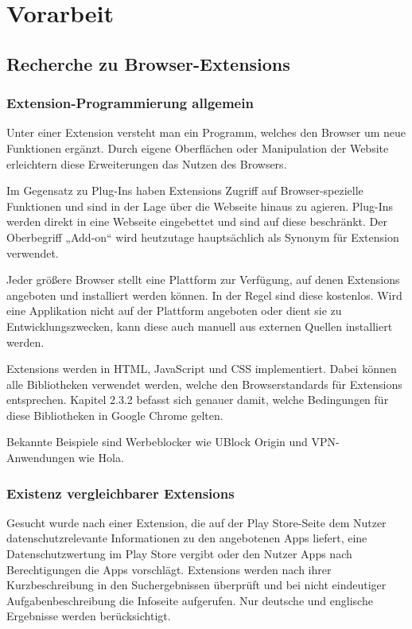 \chapter{Vorarbeit}
\label{c:vorarbeit}


\section{Recherche zu Browser-Extensions}
\label{s:recherchebrowserextensions}

\subsection{Extension-Programmierung allgemein}
\label{ss:extensionprogallg}

Unter einer Extension versteht man ein Programm, welches den Browser um neue Funktionen ergänzt. Durch eigene Oberflächen oder Manipulation der Website erleichtern diese Erweiterungen das Nutzen des Browsers.

Im Gegensatz zu Plug-Ins haben Extensions Zugriff auf Browser-spezielle Funktionen und sind in der Lage über die Webseite hinaus zu agieren. Plug-Ins werden direkt in eine Webseite eingebettet und sind auf diese beschränkt. Der Oberbegriff „Add-on“ wird heutzutage hauptsächlich als Synonym für Extension verwendet.

Jeder größere Browser stellt eine Plattform zur Verfügung, auf denen Extensions angeboten und installiert werden können. In der Regel sind diese kostenlos. Wird eine Applikation nicht auf der Plattform angeboten oder dient sie zu Entwicklungszwecken, kann diese auch manuell aus externen Quellen installiert werden.

Extensions werden in HTML, JavaScript und CSS implementiert. Dabei können alle Bibliotheken verwendet werden, welche den Browserstandards für Extensions entsprechen. Kapitel 2.3.2 befasst sich genauer damit, welche Bedingungen für diese Bibliotheken in Google Chrome gelten.

Bekannte Beispiele sind Werbeblocker wie UBlock Origin und VPN-Anwendungen wie Hola.

\subsection{Existenz vergleichbarer Extensions}
\label{ss:vergleichbareextensions}

Gesucht wurde nach einer Extension, die auf der Play Store-Seite dem Nutzer datenschutzrelevante Informationen zu den angebotenen Apps liefert, eine Datenschutzwertung im Play Store vergibt oder den Nutzer Apps nach Berechtigungen die Apps vorschlägt.
Extensions werden nach ihrer Kurzbeschreibung in den Suchergebnissen überprüft und bei nicht eindeutiger Aufgabenbeschreibung die Infoseite aufgerufen. Nur deutsche und englische  Ergebnisse werden berücksichtigt.

